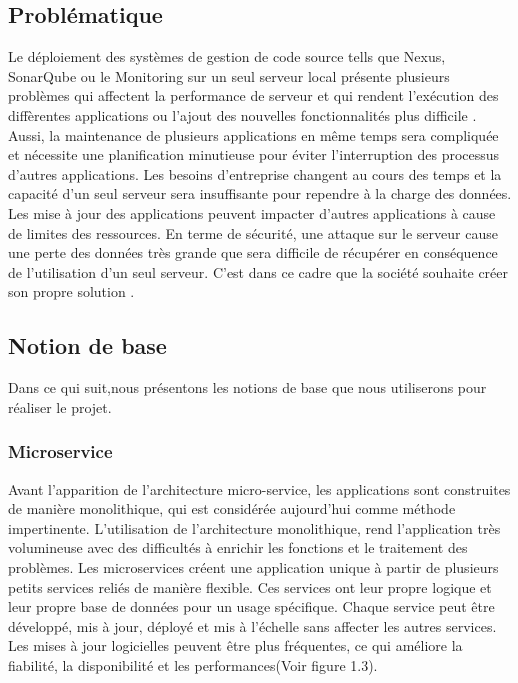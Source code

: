 \subsection{\selectfont\Large Problématique }
Le déploiement des systèmes de gestion de code source tells que Nexus, SonarQube ou le Monitoring sur un seul serveur local présente plusieurs problèmes qui affectent la performance de serveur et qui rendent l’exécution des diffèrentes applications ou l’ajout des nouvelles fonctionnalités plus difficile . Aussi, la maintenance de plusieurs applications en même temps sera compliquée et nécessite une planification minutieuse pour éviter l’interruption des processus d’autres applications. Les besoins d’entreprise changent au cours des temps et la capacité d'un seul serveur sera insuffisante pour rependre à la charge des données. Les mise à jour des applications peuvent impacter d'autres applications à cause de limites des ressources. En terme de sécurité, une attaque sur le serveur cause une perte des données très grande que sera difficile de récupérer en conséquence de l’utilisation d'un seul serveur.
C'est dans ce cadre que la société souhaite créer son propre solution .
\subsection{\selectfont\Large Notion de base}
 Dans ce qui suit,nous présentons les notions de base que nous utiliserons pour réaliser le projet.
\subsubsection{\selectfont\Large  Microservice}
    Avant l'apparition de l'architecture micro-service, les applications sont construites de manière monolithique, qui est considérée aujourd’hui comme méthode impertinente. L’utilisation de l'architecture monolithique, rend l’application très
    volumineuse avec des difficultés à enrichir les fonctions et le traitement des problèmes.
    Les microservices créent une application unique à partir de plusieurs petits services reliés de manière flexible.
    Ces services ont leur propre logique et leur propre base de données pour un usage spécifique. Chaque service peut être développé, mis à jour, déployé et mis à l’échelle sans affecter les autres services. Les mises à jour logicielles peuvent être plus fréquentes, ce qui améliore la fiabilité, la disponibilité et les performances(Voir figure 1.3). 

